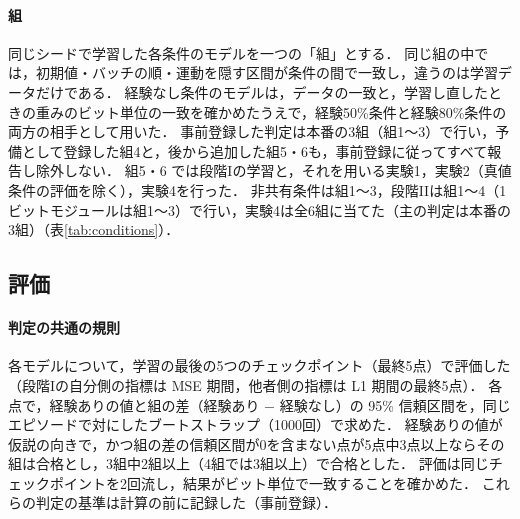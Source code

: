 \paragraph{組}
同じシードで学習した各条件のモデルを一つの「組」とする．
同じ組の中では，初期値・バッチの順・運動を隠す区間が条件の間で一致し，違うのは学習データだけである．
経験なし条件のモデルは，データの一致と，学習し直したときの重みのビット単位の一致を確かめたうえで，経験50\%条件と経験80\%条件の両方の相手として用いた．
事前登録した判定は本番の3組（組1〜3）で行い，予備として登録した組4と，後から追加した組5・6も，事前登録に従ってすべて報告し除外しない．
組5・6 では段階Iの学習と，それを用いる実験1，実験2（真値条件の評価を除く），実験4を行った．
非共有条件は組1〜3，段階IIは組1〜4（1ビットモジュールは組1〜3）で行い，実験4は全6組に当てた（主の判定は本番の3組）（表\ref{tab:conditions}）．

\begin{table}[t]
  \centering
  \caption{条件と組の一覧}
  \label{tab:conditions}
  
\end{table}

\subsection{評価}\label{sec:evaluation}

\paragraph{判定の共通の規則}
各モデルについて，学習の最後の5つのチェックポイント（最終5点）で評価した（段階Iの自分側の指標は MSE 期間，他者側の指標は L1 期間の最終5点）．
各点で，経験ありの値と組の差（経験あり $-$ 経験なし）の 95\% 信頼区間を，同じエピソードで対にしたブートストラップ（1000回）で求めた．
経験ありの値が仮説の向きで，かつ組の差の信頼区間が0を含まない点が5点中3点以上ならその組は合格とし，3組中2組以上（4組では3組以上）で合格とした．
評価は同じチェックポイントを2回流し，結果がビット単位で一致することを確かめた．
これらの判定の基準は計算の前に記録した（事前登録）．

